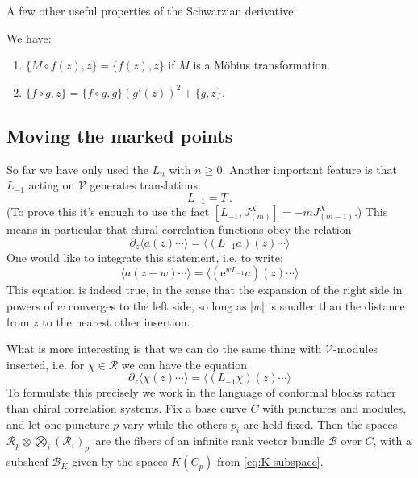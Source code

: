 \documentclass[12pt,letterpaper,reqno]{amsart}
\numberwithin{equation}{section}
\newcommand{\cB}{\ensuremath{\mathcal B}}
\newcommand{\e}{{\mathrm e}}
\newcommand{\vertex}{\mathcal{V}}
\newcommand{\vrep}{\mathcal{R}}
\newcommand{\abs}[1]{\lvert#1\rvert}
\newcommand{\IP}[1]{\langle#1\rangle}
\begin{document}
A few other useful properties of the Schwarzian derivative:
\begin{prop} We have:
\begin{enumerate}
\item  $\{ M \circ f(z), z \} = \{ f(z), z \}$ if $M$ is a M\"obius transformation.
\item  $\{ f \circ g, z \} = \{f \circ g, g \} (g'(z))^2 + \{ g, z \}$.
\end{enumerate}
\end{prop}


\subsection{Moving the marked points}

So far we have only used the $L_n$ with $n \ge 0$. Another 
important feature is that $L_{-1}$ acting on $\vertex$ 
generates translations:
\begin{equation}
  L_{-1} = T \, .
\end{equation}
(To prove this it's enough to use the fact $[L_{-1}, J^X_{(m)}] = -m J^X_{(m-1)}$.)
This means in particular that chiral correlation functions obey the relation
\begin{equation}
  \partial_z \IP{ a(z) \cdots } = \IP{ (L_{-1} a)(z) \cdots }
\end{equation}
One would like to integrate this statement, i.e. to write:
\begin{equation}
  \IP{ a(z+w) \cdots } = \IP{ (\e^{w L_{-1}} a)(z) \cdots }
\end{equation}
This equation is indeed true, in the sense that the 
expansion of the right side in powers of $w$ converges to the left side, so long 
as $\abs{w}$ is smaller than the distance from $z$ to the nearest other insertion.

What is more interesting is that we can do the same thing with $\vertex$-modules inserted, i.e.
for $\chi \in \vrep$ we can have the equation
\begin{equation}
  \partial_z \IP{ \chi(z) \cdots } = \IP{ (L_{-1} \chi)(z) \cdots }
\end{equation}
To formulate this precisely we work in the language of conformal blocks rather than chiral correlation 
systems. Fix a base curve $C$ with punctures and modules, 
and let one puncture $p$ vary while the others $p_i$ are held fixed. 
Then the spaces $\vrep_p \otimes \bigotimes_i (\vrep_i)_{p_i}$
are the fibers of an infinite rank vector bundle $\cB$ over $C$,
with a subsheaf $\cB_K$ given by the spaces $K(C_p)$ from \eqref{eq:K-subspace}.
\end{document}
